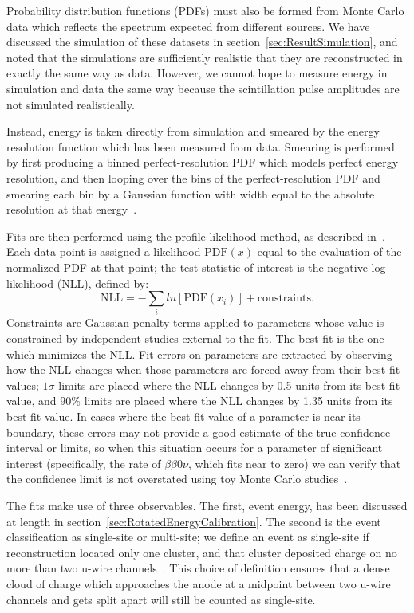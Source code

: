 Probability distribution functions (PDFs) must also be formed from Monte Carlo data which reflects the spectrum expected from different sources.  We have discussed the simulation of these datasets in section~\ref{sec:ResultSimulation}, and noted that the simulations are sufficiently realistic that they are reconstructed in exactly the same way as data.  However, we cannot hope to measure energy in simulation and data the same way because the scintillation pulse amplitudes are not simulated realistically.

Instead, energy is taken directly from simulation and smeared by the energy resolution function which has been measured from data.  Smearing is performed by first producing a binned perfect-resolution PDF which models perfect energy resolution, and then looping over the bins of the perfect-resolution PDF and smearing each bin by a Gaussian function with width equal to the absolute resolution at that energy~\cite{FittingDocument}.

Fits are then performed using the profile-likelihood method, as described in~\cite{ProfileLikelihood}.  Each data point is assigned a likelihood $\text{PDF}(x)$ equal to the evaluation of the normalized PDF at that point; the test statistic of interest is the negative log-likelihood (NLL), defined by:
\begin{equation}
\text{NLL} = -\sum_i ln\left[\text{PDF}(x_i)\right] + \text{constraints}.
\end{equation}
Constraints are Gaussian penalty terms applied to parameters whose value is constrained by independent studies external to the fit.  The best fit is the one which minimizes the NLL.  Fit errors on parameters are extracted by observing how the NLL changes when those parameters are forced away from their best-fit values; $1\sigma$ limits are placed where the NLL changes by 0.5 units from its best-fit value, and $90\%$ limits are placed where the NLL changes by 1.35 units from its best-fit value.  In cases where the best-fit value of a parameter is near its boundary, these errors may not provide a good estimate of the true confidence interval or limits, so when this situation occurs for a parameter of significant interest (specifically, the rate of $\beta\beta 0\nu$, which fits near to zero) we can verify that the confidence limit is not overstated using toy Monte Carlo studies~\cite{FittingDocument}.

The fits make use of three observables.  The first, event energy, has been discussed at length in section~\ref{sec:RotatedEnergyCalibration}.  The second is the event classification as single-site or multi-site; we define an event as single-site if reconstruction located only one cluster, and that cluster deposited charge on no more than two u-wire channels~\cite{FittingDocument}.  This choice of definition ensures that a dense cloud of charge which approaches the anode at a midpoint between two u-wire channels and gets split apart will still be counted as single-site.

